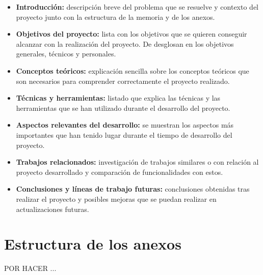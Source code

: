 \begin{itemize}
\tightlist
\item
  \textbf{Introducción:} descripción breve del problema que se resuelve y contexto del proyecto junto con la estructura de la memoria y de los anexos.
\item
  \textbf{Objetivos del proyecto:} lista con los objetivos que se quieren conseguir alcanzar con la realización del proyecto. De desglosan en los objetivos generales, técnicos y personales.
\item
  \textbf{Conceptos teóricos:} explicación sencilla sobre los conceptos teóricos que son necesarios para comprender correctamente el proyecto realizado.
\item
  \textbf{Técnicas y herramientas:} listado que explica las técnicas y las herramientas que se han utilizado durante el desarrollo del proyecto.
\item
  \textbf{Aspectos relevantes del desarrollo:} se muestran los aspectos más importantes que han tenido lugar durante el tiempo de desarrollo del proyecto.
\item
  \textbf{Trabajos relacionados:} investigación de trabajos similares o con relación al proyecto desarrollado y comparación de funcionalidades con estos.
\item
  \textbf{Conclusiones y líneas de trabajo futuras:} conclusiones obtenidas tras realizar el proyecto y posibles mejoras que se puedan realizar en actualizaciones futuras.
\end{itemize}



\section{Estructura de los anexos}\label{materiales-adjuntos}

POR HACER ...